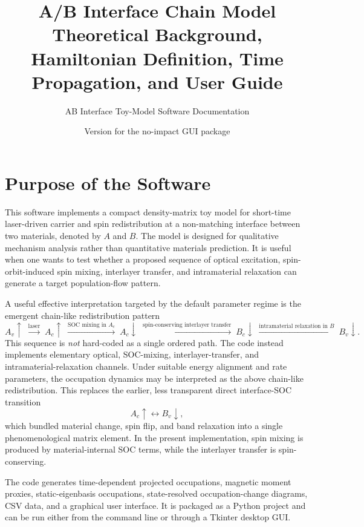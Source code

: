 \documentclass[11pt,a4paper]{article}
\title{A/B Interface Chain Model\\
\large Theoretical Background, Hamiltonian Definition, Time Propagation, and User Guide}
\author{AB Interface Toy-Model Software Documentation}
\date{Version for the no-impact GUI package}
\begin{document}
\maketitle

\tableofcontents
\newpage

\section{Purpose of the Software}

This software implements a compact density-matrix toy model for short-time laser-driven carrier and spin redistribution at a non-matching interface between two materials, denoted by $A$ and $B$.  The model is designed for qualitative mechanism analysis rather than quantitative materials prediction.  It is useful when one wants to test whether a proposed sequence of optical excitation, spin-orbit-induced spin mixing, interlayer transfer, and intramaterial relaxation can generate a target population-flow pattern.

A useful effective interpretation targeted by the default parameter regime is the emergent chain-like redistribution pattern
\begin{equation}
A_v\uparrow
\;\xrightarrow{\text{laser}}\;
A_c\uparrow
\;\xrightarrow{\text{SOC mixing in }A_c}\;
A_c\downarrow
\;\xrightarrow{\text{spin-conserving interlayer transfer}}\;
B_c\downarrow
\;\xrightarrow{\text{intramaterial relaxation in }B}\;
B_v\downarrow.
\end{equation}
This sequence is \emph{not} hard-coded as a single ordered path.  The code instead implements elementary optical, SOC-mixing, interlayer-transfer, and intramaterial-relaxation channels.  Under suitable energy alignment and rate parameters, the occupation dynamics may be interpreted as the above chain-like redistribution.  This replaces the earlier, less transparent direct interface-SOC transition
\begin{equation}
A_c\uparrow \leftrightarrow B_v\downarrow,
\end{equation}
which bundled material change, spin flip, and band relaxation into a single phenomenological matrix element.  In the present implementation, spin mixing is produced by material-internal SOC terms, while the interlayer transfer is spin-conserving.

The code generates time-dependent projected occupations, magnetic moment proxies, static-eigenbasis occupations, state-resolved occupation-change diagrams, CSV data, and a graphical user interface.  It is packaged as a Python project and can be run either from the command line or through a Tkinter desktop GUI.
\end{document}
